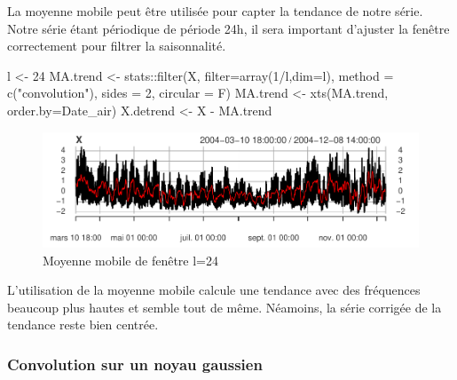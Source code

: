 \documentclass[
]{article}
\newenvironment{Shaded}{\begin{snugshade}}{\end{snugshade}}
\newcommand{\AttributeTok}[1]{\textcolor[rgb]{0.77,0.63,0.00}{#1}}
\newcommand{\DecValTok}[1]{\textcolor[rgb]{0.00,0.00,0.81}{#1}}
\newcommand{\FunctionTok}[1]{\textcolor[rgb]{0.00,0.00,0.00}{#1}}
\newcommand{\NormalTok}[1]{#1}
\newcommand{\OtherTok}[1]{\textcolor[rgb]{0.56,0.35,0.01}{#1}}
\newcommand{\SpecialCharTok}[1]{\textcolor[rgb]{0.00,0.00,0.00}{#1}}
\newcommand{\StringTok}[1]{\textcolor[rgb]{0.31,0.60,0.02}{#1}}
\begin{document}
La moyenne mobile peut être utilisée pour capter la tendance de notre
série. Notre série étant périodique de période 24h, il sera important
d'ajuster la fenêtre correctement pour filtrer la saisonnalité.

\begin{Shaded}
\begin{Highlighting}[]
\NormalTok{l }\OtherTok{\textless{}{-}} \DecValTok{24}
\NormalTok{MA.trend }\OtherTok{\textless{}{-}}\NormalTok{ stats}\SpecialCharTok{::}\FunctionTok{filter}\NormalTok{(X, }\AttributeTok{filter=}\FunctionTok{array}\NormalTok{(}\DecValTok{1}\SpecialCharTok{/}\NormalTok{l,}\AttributeTok{dim=}\NormalTok{l),}
                  \AttributeTok{method =} \FunctionTok{c}\NormalTok{(}\StringTok{"convolution"}\NormalTok{),}
                  \AttributeTok{sides =} \DecValTok{2}\NormalTok{, }\AttributeTok{circular =}\NormalTok{ F)}
\NormalTok{MA.trend }\OtherTok{\textless{}{-}} \FunctionTok{xts}\NormalTok{(MA.trend, }\AttributeTok{order.by=}\NormalTok{Date\_air)}
\NormalTok{X.detrend }\OtherTok{\textless{}{-}}\NormalTok{ X }\SpecialCharTok{{-}}\NormalTok{ MA.trend}
\end{Highlighting}
\end{Shaded}

\begin{figure}

{\centering \includegraphics{STA202_report_files/figure-latex/ma-1} 

}

\caption{\label{fig:ma} Moyenne mobile de fenêtre l=24}\label{fig:ma}
\end{figure}

L'utilisation de la moyenne mobile calcule une tendance avec des
fréquences beaucoup plus hautes et semble tout de même. Néamoins, la
série corrigée de la tendance reste bien centrée.

\hypertarget{convolution-sur-un-noyau-gaussien}{%
\subsubsection{Convolution sur un noyau
gaussien}\label{convolution-sur-un-noyau-gaussien}}
\end{document}

